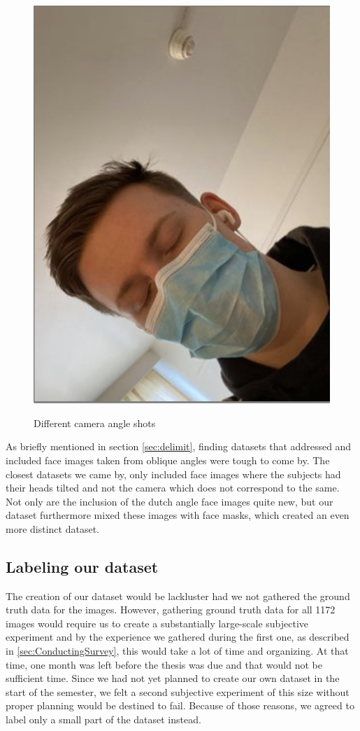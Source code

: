 \begin{figure}[h]
        {\includegraphics[scale = 0.295]{figures/0699.png}}
    \caption{Different camera angle shots}
    \label{fig:tilt}
\end{figure}

As briefly mentioned in section \ref{sec:delimit}, finding datasets that addressed and included face images taken from oblique angles were tough to come by. The closest datasets we came by, only included face images where the subjects had their heads tilted and not the camera which does not correspond to the same. Not only are the inclusion of the dutch angle face images quite new, but our dataset furthermore mixed these images with face masks, which created an even more distinct dataset. 

\subsection*{Labeling our dataset}
The creation of our dataset would be lackluster had we not gathered the ground truth data for the images. However, gathering ground truth data for all 1172 images would require us to create a substantially large-scale subjective experiment and by the experience we gathered during the first one, as described in \ref{sec:ConductingSurvey}, this would take a lot of time and organizing. At that time, one month was left before the thesis was due and that would not be sufficient time. Since we had not yet planned to create our own dataset in the start of the semester, we felt a second subjective experiment of this size without proper planning would be destined to fail. Because of those reasons, we agreed to label only a small part of the dataset instead.  \newpage

